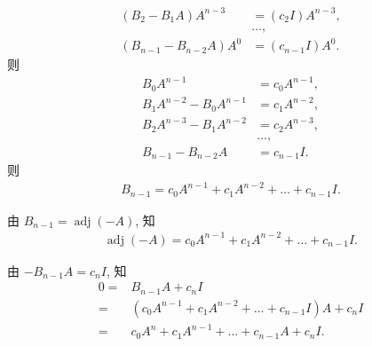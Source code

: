 \documentclass[../libro.tex]{subfiles}
\begin{document}
\begin{example}
\begin{align*}
        (B_2 - B_1 A) A^{n-3}     & = (c_2 I) A^{n-3}, \\
        & \dots, \\
        (B_{n-1} - B_{n-2} A) A^0 & = (c_{n-1} I) A^0.
    \end{align*}
    则
    \begin{align*}
        B_0 A^{n-1}               & = c_0 A^{n-1}, \\
        B_1 A^{n-2} - B_0 A^{n-1} & = c_1 A^{n-2}, \\
        B_2 A^{n-3} - B_1 A^{n-2} & = c_2 A^{n-3}, \\
        & \dots, \\
        B_{n-1} - B_{n-2} A       & = c_{n-1} I.
    \end{align*}
    则
    \begin{align*}
        B_{n-1} = c_0 A^{n-1} + c_1 A^{n-2} + \dots + c_{n-1} I.
    \end{align*}

    由 \(B_{n-1} = \operatorname{adj} {(-A)}\),
    知
    \begin{align*}
        \operatorname{adj} {(-A)}
        = c_0 A^{n-1} + c_1 A^{n-2} + \dots + c_{n-1} I.
    \end{align*}

    由 \(-B_{n-1} A = c_n I\), 知
    \begin{align*}
        0
        = {} &
        B_{n-1} A + c_n I
        \\
        = {} &
        (c_0 A^{n-1} + c_1 A^{n-2} + \dots + c_{n-1} I) A + c_n I
        \\
        = {} &
        c_0 A^{n} + c_1 A^{n-1} + \dots + c_{n-1} A + c_{n} I.
    \end{align*}



\end{example}
\end{document}
